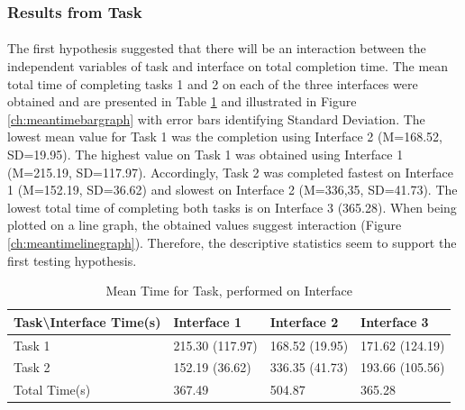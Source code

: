 \documentclass{l4proj}
\begin{document}
\subsubsection{Results from Task}
\paragraph{}
The first hypothesis suggested that there will be an interaction between the independent variables of task and interface on total completion time. The mean total time of completing tasks 1 and 2 on each of the three interfaces were obtained and are presented in Table \ref{tab:timepertaskandinterface} and illustrated in Figure \ref{ch:meantimebargraph} with error bars identifying Standard Deviation. The lowest mean value for Task 1 was the completion using Interface 2 (M=168.52, SD=19.95). The highest value on Task 1 was obtained using Interface 1 (M=215.19, SD=117.97).  Accordingly, Task 2 was completed fastest on Interface 1 (M=152.19, SD=36.62) and slowest on Interface 2 (M=336,35, SD=41.73). The lowest total time of completing both tasks is on Interface 3 (365.28). When being plotted on a line graph, the obtained values suggest interaction (Figure \ref{ch:meantimelinegraph}). Therefore, the descriptive statistics seem to support the first testing hypothesis. 
\begin{table}[H]
	\centering
	\begin{tabular}{|l|l|l|l|} \hline
		Task\textbackslash Interface Time(s)&	Interface 1	& Interface 2 &	Interface 3 \\ \hline
		Task 1 	& 215.30 (117.97)	& 168.52 (19.95)	& 171.62 (124.19)  \\ \hline
		Task 2	& 152.19 (36.62)	& 336.35 (41.73)	& 193.66 (105.56)  \\ \hline
		Total Time(s)	& 367.49 & 	504.87	& 365.28 \\ \hline
	\end{tabular}
		\caption{Mean Time for Task, performed on Interface}
		\label{tab:timepertaskandinterface}
\end{table}
\end{document}
